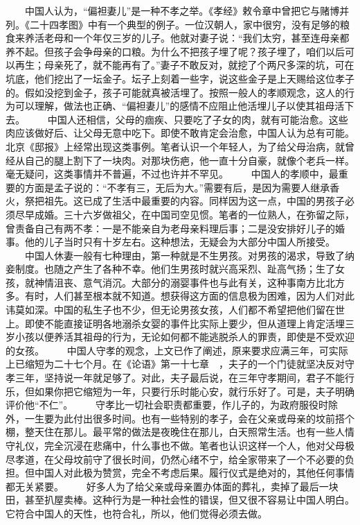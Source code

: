 \documentclass[12pt,oneside]{book}
\begin{document}
\begin{common-format}
　　中国人认为，“偏袒妻儿”是一种不孝之举。《孝经》敕令章中曾把它与赌博并列。《二十四孝图》中有一个典型的例子。一位汉朝人，家中很穷，没有足够的粮食来养活老母和一个年仅三岁的儿子。他就对妻子说：“我们太穷，甚至连母亲都养不起。但孩子会争母亲的口粮。为什么不把孩子埋了呢？孩子埋了，咱们以后可以再生；母亲死了，就不能再有了。”妻子不敢反对，就挖了个两尺多深的坑，可在坑底，他们挖出了一坛金子。坛子上刻着一些字，说这些金子是上天赐给这位孝子的。假如没挖到金子，孩子可能就真被活埋了。按照一般人的孝顺观念，这人的行为可以理解，做法也正确、“偏袒妻儿”的感情不应阻止他活埋儿子以使其祖母活下去。 
　　中国人还相信，父母的痼疾、只要吃了子女的肉，就有可能治愈。这些肉应该做好后、让父母无意中吃下。即使不敢肯定会治愈，中国人认为总有可能。北京《邸报》上经常出现这类事例。笔者认识一个年轻人，为了给父母治病，就曾经从自己的腿上割下了一块肉。对那块伤疤，他一直十分自豪，就像个老兵一样。毫无疑问，这类事情并不普遍，不过也许并不罕见。 
　　中国人的孝顺中，最重要的方面是孟子说的：“不孝有三，无后为大。”需要有后，是因为需要人继承香火，祭把祖先。这已成了生活中最重要的内容。同样因为这一点，中国的男孩子必须尽早成婚。三十六岁做祖父，在中国司空见惯。笔者的一位熟人，在弥留之际，曾责备自己有两不孝：一是不能亲自为老母亲料理后事；二是没安排好儿子的婚事。他的儿子当时只有十岁左右。这种想法，无疑会为大部分中国人所接受。 
　　中国人休妻一般有七种理由，第一种就是不生男孩。对男孩的渴求，导致了纳妾制度。也随之产生了各种不幸。他们生男孩时就兴高采烈、趾高气扬；生了女孩，就神情沮丧、意气消沉。大部分的溺婴事件也与此有关，这种事南方比北方多。有时，人们甚至根本就不知道。想获得这方面的信息极为困难，因为人们对此讳莫如深。中国的私生子也不少，但无论男孩女孩，人们都不希望把他们留在世上。即使不能直接证明各地溺杀女婴的事件比实际上要少，但从道理上肯定活埋三岁小孩以便养活其祖母的行为，无论如何都不能逃脱杀人的罪责，即使是不受欢迎的女孩。 
　　中国人守孝的观念，上文已作了阐述，原来要求应满三年，可实际上已缩短为二十七个月。在《论语》第一十七章　，夫子的一个门徒就坚决反对守孝三年，坚持说一年就足够了。对此，夫子最后说，在三年守孝期间，君子不能行乐，但如果你把它缩短为一年，只要行乐时能心安，就行乐好了。可是，夫子明确评价他“不仁”。 
　　守孝比一切社会职责都重要，作儿子的，为政府服役时除外，一生要为此付出很多时间。也有一些特别的孝子，会在父亲或母亲的坟前搭个棚，整天住在那儿。最平常的做法是夜晚住在那儿，白天照常生活。也有一些人情守礼仪，完全沉浸在悲痛中，什么事也不做。笔者也认识这样一个人，他对父母极尽孝道，在父母坟前守了很长时间，仍然心绪不宁，给全家带来了一个不必要的负担。但中国人对此极为赞赏，完全不考虑后果。履行仪式是绝对的，其他任何事情都无关紧要。 
　　好多人为了给父亲或母亲置办体面的葬礼，卖掉了最后一块田，甚至扒屋卖棒。这种行为是一种社会性的错误，但又很不容易让中国人明白。它符合中国人的天性，也符合礼，所以，他们觉得必须去做。 

\end{common-format}
\end{document}
